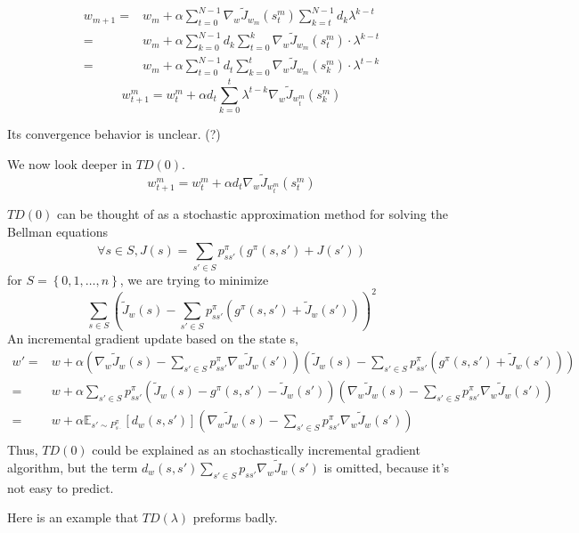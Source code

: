 \begin{align*}
    w_{m+1} =& w_m + \alpha \sum^{N-1}_{t = 0} \nabla_{w} \tilde J_{w_m}(s^m_t) \sum^{N-1}_{k = t} d_k \lambda^{k-t}\\
    =& w_m + \alpha \sum^{N-1}_{k = 0} d_k \sum^{k}_{t = 0} \nabla_w \tilde J_{w_m} (s^m_{t}) \cdot \lambda^{k-t}\\
    =& w_m + \alpha \sum^{N-1}_{t = 0} d_t \sum^{t}_{k = 0} \nabla_w \tilde J_{w_m} (s^m_{k}) \cdot \lambda^{t-k}
\end{align*}
\[
    w^{m}_{t+1} = w^{m}_{t} + \alpha d_t \sum^{t}_{k = 0} \lambda^{t-k} \nabla_{w}\tilde J_{w^m_t}(s^m_{k})
\]

Its convergence behavior is unclear. (?)

We now look deeper in $ TD(0) $. 
\[
    w^{m}_{t+1} = w^{m}_{t} + \alpha d_t \nabla_{w} \tilde J_{w^{m}_{t}}(s^m_t)
\]

$ TD(0) $ can be thought of as a stochastic approximation method for solving the Bellman equations
\[
    \forall s \in S, J(s) = \sum^{}_{s' \in S} p^{\pi}_{ss'}(g^{\pi}(s, s') + J(s'))
\]
for $ S = \left\{ 0, 1, \ldots, n \right\} $, we are trying to minimize
\[
    \sum^{}_{s \in S} {\left( \tilde J_{w}(s) - \sum^{}_{s' \in S} p^{\pi}_{ss'}(g^{\pi}(s, s') + \tilde J_{w}(s')) \right)}^2
\]
An incremental gradient update based on the state s,
\begin{align*}
    w' =& w + \alpha \left( \nabla_{w} \tilde J_{w}(s) - \sum^{}_{s' \in S} p^{\pi}_{ss'} \nabla_w \tilde J_{w}(s')\right)\left( \tilde J_{w}(s) - \sum^{}_{s' \in S} p^{\pi}_{ss'}(g^{\pi}(s, s') + \tilde J_{w}(s')) \right) \\
     =& w + \alpha \sum^{}_{s' \in S} p^{\pi}_{ss'} \left( \tilde J_{w}(s) - g^{\pi}(s, s') - \tilde J_{w}(s') \right) \left( \nabla_{w} \tilde J_{w}(s) - \sum^{}_{s' \in S} p^{\pi}_{ss'} \nabla_w \tilde J_{w}(s')\right)\\
     =& w + \alpha \mathbb{E}_{s' \sim P^{\pi}_{s\cdot}}\left[ d_{w}(s, s') \right]\left( \nabla_{w} \tilde J_{w}(s) - \sum^{}_{s' \in S} p^{\pi}_{ss'} \nabla_w \tilde J_{w}(s')\right)\\
\end{align*}
Thus, $ TD(0) $ could be explained as an stochastically incremental gradient algorithm, but the term $ d_{w}(s,s') \sum^{}_{s' \in S} p_{ss'}\nabla_w \tilde J_{w}(s') $ is omitted, because it's not easy to predict.

Here is an example that $ TD(\lambda) $ preforms badly.

